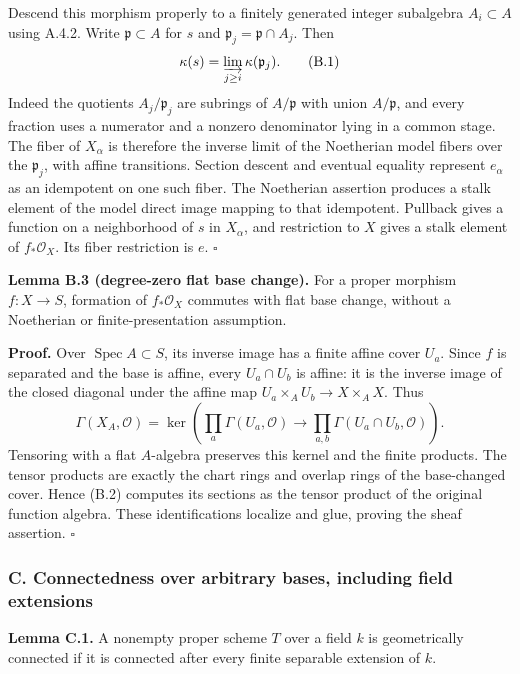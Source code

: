 \documentclass[11pt]{article}
\begin{document}
Descend this morphism properly to a finitely generated integer
subalgebra \(A_i\subset A\) using A.4.2. Write \(\mathfrak p\subset A\)
for \(s\) and \(\mathfrak p_j=\mathfrak p\cap A_j\). Then \[
\kappa(s)=\varinjlim_{j\ge i}\kappa(\mathfrak p_j).
\tag{B.1}
\] Indeed the quotients \(A_j/\mathfrak p_j\) are subrings of
\(A/\mathfrak p\) with union \(A/\mathfrak p\), and every fraction uses
a numerator and a nonzero denominator lying in a common stage. The fiber
of \(X_\alpha\) is therefore the inverse limit of the Noetherian model
fibers over the \(\mathfrak p_j\), with affine transitions. Section
descent and eventual equality represent \(e_\alpha\) as an idempotent on
one such fiber. The Noetherian assertion produces a stalk element of the
model direct image mapping to that idempotent. Pullback gives a function
on a neighborhood of \(s\) in \(X_\alpha\), and restriction to \(X\)
gives a stalk element of \(f_*\mathcal O_X\). Its fiber restriction is
\(e\). \(\square\)

\textbf{Lemma B.3 (degree-zero flat base change).} For a proper morphism
\(f:X\to S\), formation of \(f_*\mathcal O_X\) commutes with flat base
change, without a Noetherian or finite-presentation assumption.

\textbf{Proof.} Over \(\operatorname{Spec}A\subset S\), its inverse
image has a finite affine cover \(U_a\). Since \(f\) is separated and
the base is affine, every \(U_a\cap U_b\) is affine: it is the inverse
image of the closed diagonal under the affine map
\(U_a\times_AU_b\to X\times_AX\). Thus \[
\Gamma(X_A,\mathcal O)
=\ker\left(\prod_a\Gamma(U_a,\mathcal O)
\longrightarrow\prod_{a,b}\Gamma(U_a\cap U_b,\mathcal O)\right).
\tag{B.2}
\] Tensoring with a flat \(A\)-algebra preserves this kernel and the
finite products. The tensor products are exactly the chart rings and
overlap rings of the base-changed cover. Hence (B.2) computes its
sections as the tensor product of the original function algebra. These
identifications localize and glue, proving the sheaf assertion.
\(\square\)

\subsubsection{C. Connectedness over arbitrary bases, including field
extensions}\label{c.-connectedness-over-arbitrary-bases-including-field-extensions}

\textbf{Lemma C.1.} A nonempty proper scheme \(T\) over a field \(k\) is
geometrically connected if it is connected after every finite separable
extension of \(k\).
\end{document}
